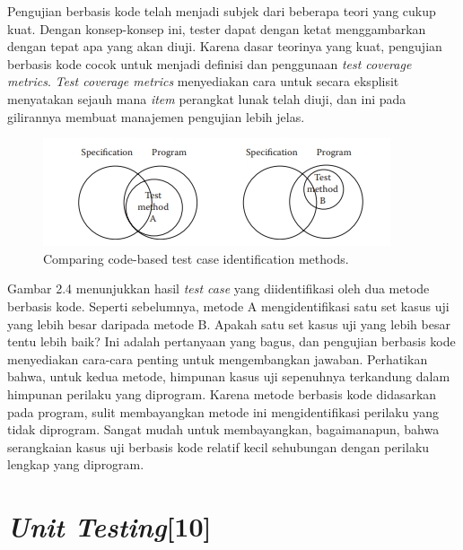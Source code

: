 Pengujian berbasis kode telah menjadi subjek dari beberapa teori yang cukup kuat. Dengan konsep-konsep ini, tester dapat dengan ketat menggambarkan dengan tepat apa yang akan diuji. Karena dasar teorinya yang kuat, pengujian berbasis kode cocok untuk menjadi definisi dan penggunaan \textit{test coverage metrics}. \textit{Test coverage metrics} menyediakan cara untuk secara eksplisit menyatakan sejauh mana \textit{item} perangkat lunak telah diuji, dan ini pada gilirannya membuat manajemen pengujian lebih jelas.
\begin{figure}[h!]
 \includegraphics[scale=1.2]{gambar/compareAB-whitebox}
 \centering
 \caption{Comparing code-based test case identification methods.}
\end{figure}
Gambar 2.4 menunjukkan hasil \textit{test case} yang diidentifikasi oleh dua metode berbasis kode. Seperti sebelumnya, metode A mengidentifikasi satu set kasus uji yang lebih besar daripada metode B. Apakah satu set kasus uji yang lebih besar tentu lebih baik? Ini adalah pertanyaan yang bagus, dan pengujian berbasis kode menyediakan cara-cara penting untuk mengembangkan jawaban. Perhatikan bahwa, untuk kedua metode, himpunan kasus uji sepenuhnya terkandung dalam himpunan perilaku yang diprogram. Karena metode berbasis kode didasarkan pada program, sulit membayangkan metode ini mengidentifikasi perilaku yang tidak diprogram. Sangat mudah untuk membayangkan, bagaimanapun, bahwa serangkaian kasus uji berbasis kode relatif kecil sehubungan dengan perilaku lengkap yang diprogram. 

\section{\textit{Unit Testing}[10]}
